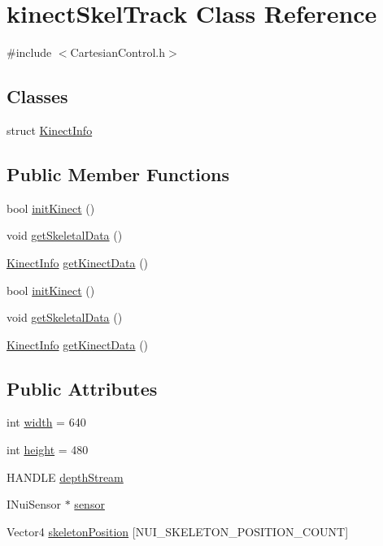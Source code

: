 \hypertarget{classkinectSkelTrack}{}\section{kinect\+Skel\+Track Class Reference}
\label{classkinectSkelTrack}


{\ttfamily \#include $<$Cartesian\+Control.\+h$>$}

\subsection*{Classes}
\begin{DoxyCompactItemize}
\item 
struct \hyperlink{structkinectSkelTrack_1_1KinectInfo}{Kinect\+Info}
\end{DoxyCompactItemize}
\subsection*{Public Member Functions}
\begin{DoxyCompactItemize}
\item 
bool \hyperlink{classkinectSkelTrack_a2960fe70db543c6f59052c69c0fc6392}{init\+Kinect} ()
\item 
void \hyperlink{classkinectSkelTrack_a5508892e28cbd0acc638cca252627365}{get\+Skeletal\+Data} ()
\item 
\hyperlink{structkinectSkelTrack_1_1KinectInfo}{Kinect\+Info} \hyperlink{classkinectSkelTrack_aae6367b3180ed7831aa417dbb82ae2f3}{get\+Kinect\+Data} ()
\item 
bool \hyperlink{classkinectSkelTrack_a2960fe70db543c6f59052c69c0fc6392}{init\+Kinect} ()
\item 
void \hyperlink{classkinectSkelTrack_a5508892e28cbd0acc638cca252627365}{get\+Skeletal\+Data} ()
\item 
\hyperlink{structkinectSkelTrack_1_1KinectInfo}{Kinect\+Info} \hyperlink{classkinectSkelTrack_a4f865d402dea4c575dae0721babbb652}{get\+Kinect\+Data} ()
\end{DoxyCompactItemize}
\subsection*{Public Attributes}
\begin{DoxyCompactItemize}
\item 
int \hyperlink{classkinectSkelTrack_a8f20f39c8822eecba07518a8b35a9f2b}{width} = 640
\item 
int \hyperlink{classkinectSkelTrack_a028f14282cd4301c8527703300d3dfe8}{height} = 480
\item 
H\+A\+N\+D\+LE \hyperlink{classkinectSkelTrack_ac736221c582bd751c18af867bd1b90f1}{depth\+Stream}
\item 
I\+Nui\+Sensor $\ast$ \hyperlink{classkinectSkelTrack_aaf976c279cb27cc57af90d65d4a7918a}{sensor}
\item 
Vector4 \hyperlink{classkinectSkelTrack_a51e7bc6d4d52ea917922103e9261cd1f}{skeleton\+Position} \mbox{[}N\+U\+I\+\_\+\+S\+K\+E\+L\+E\+T\+O\+N\+\_\+\+P\+O\+S\+I\+T\+I\+O\+N\+\_\+\+C\+O\+U\+NT\mbox{]}
\end{DoxyCompactItemize}


